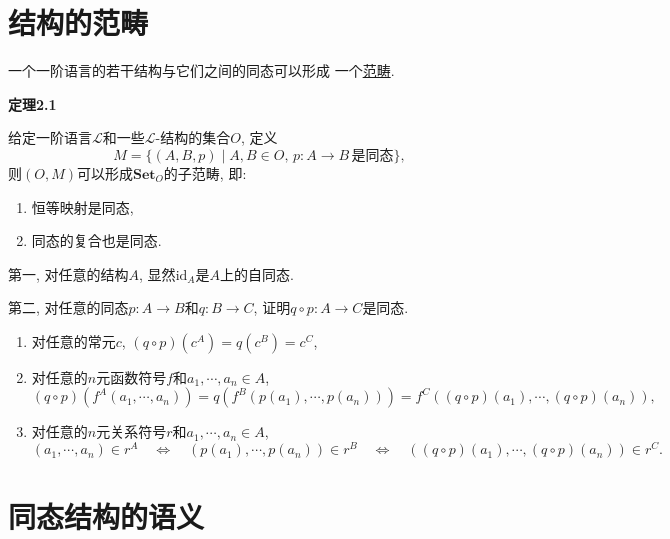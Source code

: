 \documentclass[UTF8]{ctexart}
\begin{document}
\newpage

\section{结构的范畴}

一个一阶语言的若干结构与它们之间的同态可以形成
一个\href{../../../02 范畴论/01 范畴、函子与自然变换/01 范畴#nameddest=sec:定义1.1}{范畴}.

\vspace{10pt}

\hypertarget{sec:定理2.1}{}
\noindent\textbf{定理2.1}

给定一阶语言$\mathcal{L}$和一些$\mathcal{L}$-结构的集合$O$, 定义
\[
    M=\{(A,B,p)\mid A,B\in O,\,p:A\to B\,\text{是同态}\},
\]
则$(O,M)$可以形成$\mathbf{Set}_O$的子范畴, 即:
\begin{enumerate}
    \item 恒等映射是同态,
    \item 同态的复合也是同态.
\end{enumerate}


第一, 对任意的结构$A$, 显然$\mathrm{id}_A$是$A$上的自同态.

第二, 对任意的同态$p:A\to B$和$q:B\to C$, 证明$q\circ p:A\to C$是同态.
\begin{enumerate}
    \item 对任意的常元$c$, $(q\circ p)(c^A)=q(c^B)=c^C$,
    \item 对任意的$n$元函数符号$f$和$a_1,\cdots,a_n\in A$,
    \[
        (q\circ p)(f^A(a_1,\cdots,a_n))
        =q(f^B(p(a_1),\cdots,p(a_n)))
        =f^C((q\circ p)(a_1),\cdots,(q\circ p)(a_n)),
    \]
    \item 对任意的$n$元关系符号$r$和$a_1,\cdots,a_n\in A$,
    \begin{equation*}
        (a_1,\cdots,a_n)\in r^A\quad\iff\quad
        (p(a_1),\cdots,p(a_n))\in r^B\quad\iff\quad
        ((q\circ p)(a_1),\cdots,(q\circ p)(a_n))\in r^C.
    \tag*{\qedsymbol}\end{equation*}
\end{enumerate}






\newpage

\section{同态结构的语义}
\end{document}
